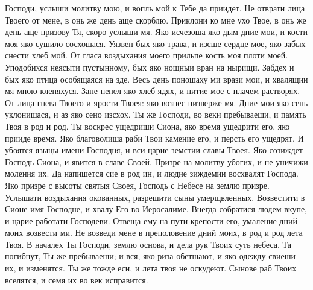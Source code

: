 \begin{mymulticols}
Господи, услыши молитву мою, и вопль мой к Тебе да приидет. Не отврати лица Твоего от мене, в онь же день аще скорблю. Приклони ко мне ухо Твое, в онь же день аще призову Тя, скоро услыши мя. Яко исчезоша яко дым дние мои, и кости моя яко сушило сосхошася. Уязвен бых яко трава, и изсше сердце мое, яко забых снести хлеб мой. От гласа воздыхания моего прильпе кость моя плоти моей. Уподобихся неясыти пустынному, бых яко нощныи вран на нырищи. Забдех и бых яко птица особящаяся на зде. Весь день поношаху ми врази мои, и хвалящии мя мною кленяхуся. Зане пепел яко хлеб ядях, и питие мое с плачем растворях. От лица гнева Твоего и ярости Твоея: яко вознес низверже мя. Дние мои яко сень уклонишася, и аз яко сено изсхох. Ты же Господи, во веки пребываеши, и память Твоя в род и род. Ты воскрес ущедриши Сиона, яко время ущедрити его, яко прииде время. Яко благоволиша раби Твои камение его, и персть его ущедрят. И убоятся языцы имени Господня, и вси царие земстии славы Твоея. Яко созиждет Господь Сиона, и явится в славе Своей. Призре на молитву убогих, и не уничижи моления их. Да напишется сие в род ин, и людие зиждемии восхвалят Господа. Яко призре с высоты святыя Своея, Господь с Небесе на землю призре. Услышати воздыхания окованных, разрешити сыны умерщвленных. Возвестити в Сионе имя Господне, и хвалу Его во Иеросалиме. Внегда собратися людем вкупе, и царие работати Господеви. Отвеща ему на пути крепости его, умаление дний моих возвести ми. Не возведи мене в преполовение дний моих, в род и род лета Твоя. В началех Ты Господи, землю основа, и дела рук Твоих суть небеса. Та погибнут, Ты же пребываеши; и вся, яко риза обетшают, и яко одежду свиеши их, и изменятся. Ты же тожде еси, и лета твоя не оскудеют. Сынове раб Твоих вселятся, и семя их во век исправится.





\end{mymulticols}
